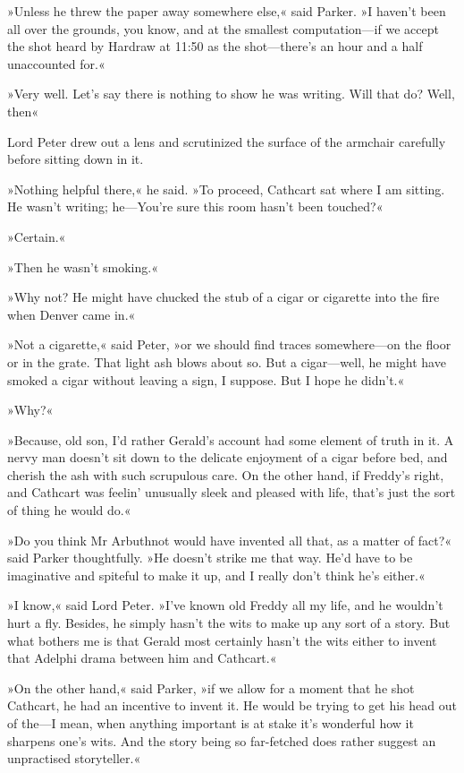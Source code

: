 »Unless he threw the paper away somewhere else,« said Parker. »I haven't been all over the grounds, you know, and at the smallest computation—if we accept the shot heard by Hardraw at 11:50 as the shot—there's an hour and a half unaccounted for.«

»Very well. Let's say there is nothing to show he was writing. Will that do? Well, then\longdash«

Lord Peter drew out a lens and scrutinized the surface of the armchair carefully before sitting down in it.

»Nothing helpful there,« he said. »To proceed, Cathcart sat where I am sitting. He wasn't writing; he—You're sure this room hasn't been touched?«

»Certain.«

»Then he wasn't smoking.«

»Why not? He might have chucked the stub of a cigar or cigarette into the fire when Denver came in.«

»Not a cigarette,« said Peter, »or we should find traces somewhere—on the floor or in the grate. That light ash blows about so. But a cigar—well, he might have smoked a cigar without leaving a sign, I suppose. But I hope he didn't.«

»Why?«

»Because, old son, I'd rather Gerald's account had some element of truth in it. A nervy man doesn't sit down to the delicate enjoyment of a cigar before bed, and cherish the ash with such scrupulous care. On the other hand, if Freddy's right, and Cathcart was feelin' unusually sleek and pleased with life, that's just the sort of thing he would do.«

»Do you think Mr Arbuthnot would have invented all that, as a matter of fact?« said Parker thoughtfully. »He doesn't strike me that way. He'd have to be imaginative and spiteful to make it up, and I really don't think he's either.«

»I know,« said Lord Peter. »I've known old Freddy all my life, and he wouldn't hurt a fly. Besides, he simply hasn't the wits to make up any sort of a story. But what bothers me is that Gerald most certainly hasn't the wits either to invent that Adelphi drama between him and Cathcart.«

»On the other hand,« said Parker, »if we allow for a moment that he shot Cathcart, he had an incentive to invent it. He would be trying to get his head out of the—I mean, when anything important is at stake it's wonderful how it sharpens one's wits. And the story being so far-fetched does rather suggest an unpractised storyteller.«

